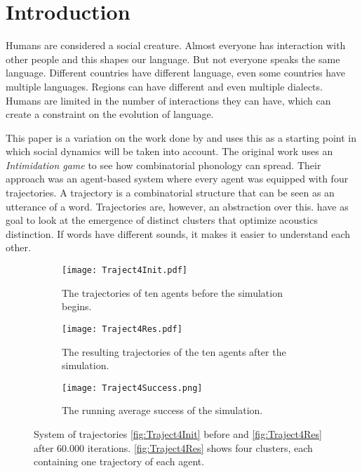 \section{Introduction}
Humans are considered a social creature.
Almost everyone has interaction with other people and this shapes our language.
But not everyone speaks the same language.
Different countries have different language, even some countries have multiple languages.
Regions can have different and even multiple dialects.
Humans are limited in the number of interactions they can have, which can create a constraint on the evolution of language.

This paper is a variation on the work done by \cite{de2010multi} and uses this as a starting point in which social dynamics will be taken into account.
The original work uses an \textit{Intimidation game} to see how combinatorial phonology can spread.
Their approach was an agent-based system where every agent was equipped with four trajectories.
A trajectory is a combinatorial structure that can be seen as an utterance of a word.
Trajectories are, however, an abstraction over this.
\citeauthor{de2010multi} have as goal to look at the emergence of distinct clusters that optimize acoustics distinction.
If words have different sounds, it makes it easier to understand each other.

\begin{figure}[t]
    \centering
    \begin{subfigure}[t]{0.3\textwidth}
        \centering
        \texttt{[image: Traject4Init.pdf]}
        \caption{The trajectories of ten agents before the simulation begins.}
        \label{fig:Traject4Init}
    \end{subfigure}
    \hfill
    \begin{subfigure}[t]{0.3\textwidth}
        \centering
        \texttt{[image: Traject4Res.pdf]}
        \caption{The resulting trajectories of the ten agents after the simulation.}
        \label{fig:Traject4Res}
    \end{subfigure}
    \hfill
    \begin{subfigure}[t]{0.3\textwidth}
        \centering
        \texttt{[image: Traject4Success.png]}
        \caption{The running average success of the simulation.}
        \label{fig:Traject4Success}
    \end{subfigure}

    \caption{System of trajectories \autoref{fig:Traject4Init} before and \autoref{fig:Traject4Res} after 60.000 iterations. \autoref{fig:Traject4Res} shows four clusters, each containing one trajectory of each agent.}
    \label{fig:Traject4}
\end{figure}

